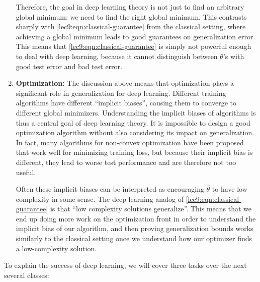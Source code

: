 \begin{enumerate}
Therefore, the goal in deep learning theory is not just to find an arbitrary global minimum: we need to find the right global minimum. This contrasts sharply with \eqref{lec9:eqn:classical-guarantee} from the classical setting, where achieving a global minimum leads to good guarantees on generalization error. This means that \eqref{lec9:eqn:classical-guarantee} is simply not powerful enough to deal with deep learning, because it cannot distinguish between $\theta$'s with good test error and bad test error.

\item {\bf Optimization:} The discussion above means that optimization plays a significant role in generalization for deep learning. Different training algorithms have different ``implicit biases'', causing them to converge to different global minimizers. Understanding the implicit biases of algorithms is thus a central goal of deep learning theory. It is impossible to design a good optimization algorithm without also considering its impact on generalization. In fact, many algorithms for non-convex optimization have been proposed that work well for minimizing training loss, but because their implicit bias is different, they lead to worse test performance and are therefore not too useful.
    
Often these implicit biases can be interpreted as encouraging $\hat\theta$ to have low complexity in some sense. The deep learning analog of  \eqref{lec9:eqn:classical-guarantee} is that ``low complexity solutions generalize''. This means that we end up doing more work on the optimization front in order to understand the implicit bias of our algorithm, and then proving generalization bounds works similarly to the classical setting once we understand how our optimizer finds a low-complexity solution.
    
\end{enumerate}

To explain the success of deep learning, we will cover three tasks over the next several classes:


